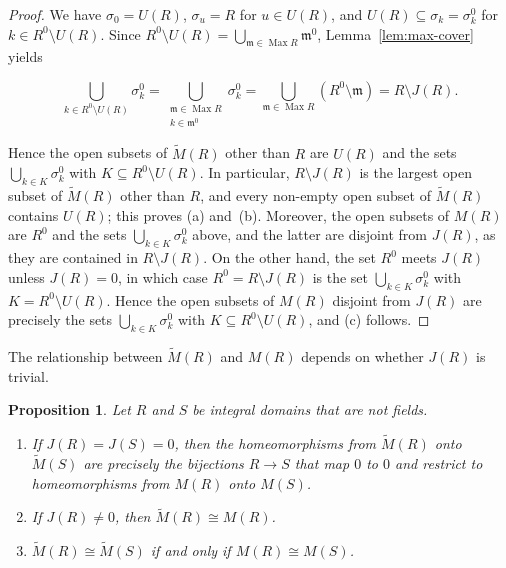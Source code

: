 \documentclass[12pt,reqno,a4paper]{amsart}
\newcommand{\m}{\mathfrak{m}}
\DeclareMathOperator{\Max}{Max}
\theoremstyle{plain}
\newtheorem{proposition}[theorem]{Proposition}
\theoremstyle{definition}
\begin{document}
\begin{proof}
We have $\sigma_0=U(R)$, $\sigma_u=R$ for $u\in U(R)$, and $U(R)\subseteq\sigma_k=\sigma_k^0$ for $k\in R^0\setminus U(R)$. Since $R^0\setminus U(R)=\bigcup\limits_{\m\in\Max R}\m^0$, Lemma~\ref{lem:max-cover} yields

\[
\bigcup_{k\in R^0\setminus U(R)}\sigma_k^0= \bigcup_{\substack{\m\in\Max R\\ k\in\m^0}}\sigma_k^0=\bigcup_{\m\in\Max R}(R^0\setminus\m)=R\setminus J(R).
\]

Hence the open subsets of $\widetilde{M}(R)$ other than $R$ are $U(R)$ and the sets $\bigcup\limits_{k\in K}\sigma_k^0$ with $K\subseteq R^0\setminus U(R)$. In particular, $R\setminus J(R)$ is the largest open subset of $\widetilde{M}(R)$ other than $R$, and every non-empty open subset of $\widetilde{M}(R)$ contains $U(R)$; this proves (a) and~(b). Moreover, the open subsets of $M(R)$ are $R^0$ and the sets $\bigcup\limits_{k\in K}\sigma_k^0$ above, and the latter are disjoint from $J(R)$, as they are contained in $R\setminus J(R)$. On the other hand, the set $R^0$ meets $J(R)$ unless $J(R)=0$, in which case $R^0=R\setminus J(R)$ is the set $\bigcup\limits_{k\in K}\sigma_k^0$ with $K=R^0\setminus U(R)$. Hence the open subsets of $M(R)$ disjoint from $J(R)$ are precisely the sets $\bigcup\limits_{k\in K}\sigma_k^0$ with $K\subseteq R^0\setminus U(R)$, and (c) follows. 
\end{proof}
The relationship between $\widetilde{M}(R)$ and $M(R)$ depends on whether $J(R)$ is trivial.
\begin{proposition}\label{prop:tilde}
Let $R$ and $S$ be integral domains that are not fields.
\begin{enumerate}[label=\textup{(\alph*)}]
\item If $J(R)=J(S)=0$, then the homeomorphisms from $\widetilde{M}(R)$ onto $\widetilde{M}(S)$ are precisely the bijections $R\to S$ that map $0$ to $0$ and restrict to homeomorphisms from $M(R)$ onto $M(S)$.
\item If $J(R)\neq0$, then $\widetilde{M}(R)\cong M(R)$.
\item $\widetilde{M}(R)\cong\widetilde{M}(S)$ if and only if $M(R)\cong M(S)$.
\end{enumerate}
\end{proposition}
\end{document}
